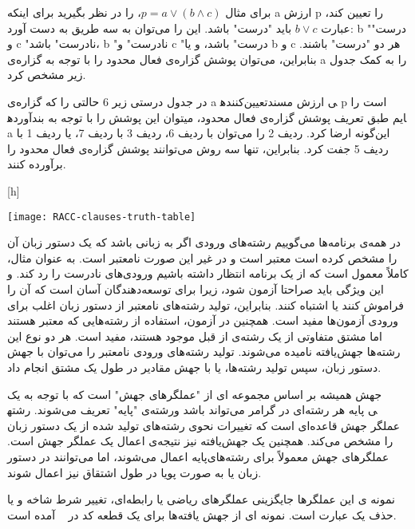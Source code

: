 برای مثال
 $p = a \vee (b \wedge c)$،
 را در نظر بگیرید برای اینکه a ارزش p را تعیین کند، عبارت
$ b \vee c$
 باید "درست" باشد. این را می‌توان به سه طریق به دست آورد: b "درست" و c "نادرست" باشد، b "نادرست" و c "درست" باشد، و یا b و c هر دو "درست" باشند. بنابراین، می‌توان پوشش گزاره‌ی فعال محدود را با توجه به گزاره‌ی a را به کمک جدول زیر مشخص کرد. 
 
در جدول درستی زیر 6 حالتی را که گزاره‌ی a تعیین‌کننده‎ی ارزش مسند p است را آورده‎ایم طبق تعریف پوشش گزاره‌ی فعال محدود، میتوان این پوشش را با توجه به بند a این‌گونه ارضا کرد. ردیف 2 را می‌توان با ردیف 6، ردیف 3 با ردیف 7، یا ردیف 1 با ردیف 5 جفت کرد. بنابراین، تنها سه روش می‌توانند پوشش گزاره‌ی فعال محدود را برآورده کنند.


[h]
\raggedright
\texttt{[image: RACC-clauses-truth-table]}
\vspace{0.1em}




در همه‌ی برنامه‌ها می‌گوییم رشته‌های ورودی اگر به زبانی باشد که یک دستور زبان آن را مشخص کرده است معتبر است و در غیر این صورت نامعتبر است. به عنوان مثال، کاملاً معمول است که از یک برنامه انتظار داشته باشیم ورودی‌های نادرست را رد کند. و این ویژگی باید صراحتا آزمون شود، زیرا برای توسعه‌دهندگان آسان است که آن را فراموش کنند یا اشتباه کنند. بنابراین، تولید رشته‌های نامعتبر از دستور زبان اغلب برای ورودی آزمون‌ها مفید است. همچنین در آزمون، استفاده از رشته‌هایی که معتبر هستند اما مشتق متفاوتی از یک رشته‌ی از قبل موجود هستند، مفید است. هر دو نوع این رشته‌ها جهش‌یافته نامیده می‌شوند. تولید رشته‌های ورودی نامعتبر را می‌توان با جهش دستور زبان، سپس تولید رشته‌ها، یا با جهش مقادیر در طول یک مشتق انجام داد.

جهش همیشه بر اساس مجموعه ای از "عملگرهای جهش" است که با توجه به یک رشته‌ی "پایه" تعریف می‌شوند. رشته‎ی پایه هر رشته‌ای در گرامر می‌تواند باشد و عملگر جهش قاعده‌ای است که تغییرات نحوی رشته‌های تولید شده از یک دستور زبان را مشخص می‌‌کند. همچنین یک جهش‌یافته نیز نتیجه‌ی اعمال یک  عملگر جهش است. عملگرهای جهش معمولاً برای رشته‌های‌پایه اعمال می‌شوند، اما می‌توانند در دستور زبان یا به صورت پویا در طول اشتقاق نیز اعمال شوند.

نمونه ی این عملگرها جایگزینی عملگرهای ریاضی یا رابطه‌ای، تغییر شرط شاخه و یا حذف یک عبارت است. نمونه ای از جهش یافته‌ها برای یک قطعه کد در ~ آمده است.

